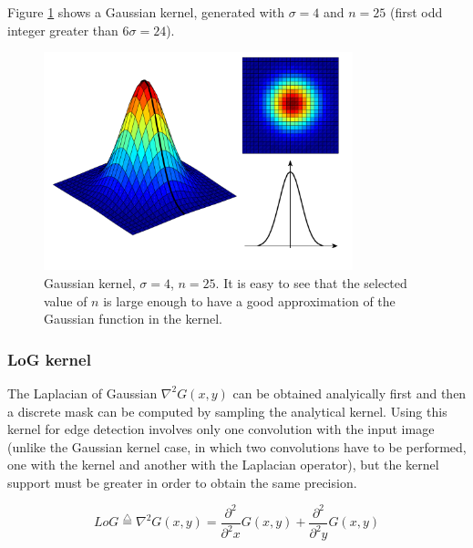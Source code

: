 \documentclass{ipol}
\numberwithin{equation}{section}
\numberwithin{table}{section}
\begin{document}
Figure \ref{fig:gaussian_kernel} shows a Gaussian kernel, generated with $\sigma = 4$ and $n = 25$ 
(first odd integer greater than $6\sigma=24$).

\begin{figure}[ht]
	\centering
	\includegraphics[width=0.8\textwidth]{kernel_gaussian.pdf}
	\caption{Gaussian kernel, $\sigma=4$, $n=25$. It is easy to see that the selected value of $n$ is 
large enough to have a good approximation of the Gaussian function in the kernel.}
	\label{fig:gaussian_kernel}
\end{figure}


\subsubsection{LoG kernel}

The Laplacian of Gaussian $\nabla^2G(x,y)$ can be obtained analyically first and then a discrete mask 
can be computed by sampling the analytical kernel. Using this kernel for edge detection involves only 
one convolution with the input image (unlike the Gaussian kernel case, in which two convolutions 
have to be performed, one with the kernel and another with the Laplacian operator), but the kernel 
support must be greater in order to obtain the same precision.


\begin{equation}
	LoG \stackrel{\triangle}{=}\nabla^2G(x,y)=\frac{\partial^2}{\partial^2 x}G(x,y) + \frac{\partial^2}{\partial^2 y}G(x,y)
\end{equation}
\end{document}
